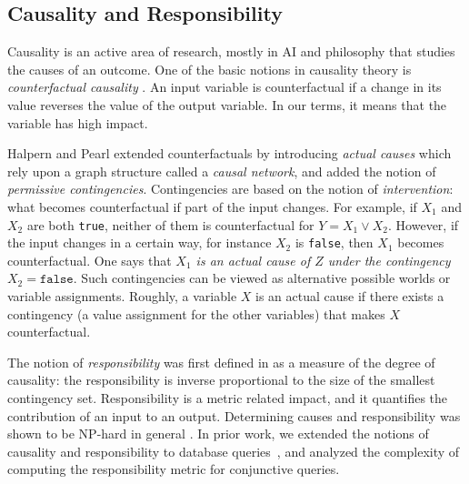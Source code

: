 \subsection*{Causality and Responsibility}
Causality is an active area of research, mostly in AI and philosophy that
studies the causes of an outcome. One of the basic notions in causality theory
is \emph{counterfactual causality} \cite{Menzies:Causation2008,Lewis1973}. An
input variable is counterfactual if a change in its value reverses the value
of the output variable. In our terms, it means that the variable has high
impact. 

Halpern and Pearl \cite{HalpernPearl:Cause2005} extended counterfactuals by
introducing \emph{actual causes} which rely upon a graph structure called a
\emph{causal network}, and added the notion of \emph{permissive
contingencies}. 
Contingencies are based on the notion of \emph{intervention}: what becomes
counterfactual if part of the input changes. For example, if $X_1$ and $X_2$
are both \texttt{true}, neither of them is counterfactual for $Y=X_1 \vee
X_2$. However, if the input changes in a certain way, for instance $X_2$ is
\texttt{false}, then $X_1$ becomes counterfactual. One says that \emph{$X_1$
is an actual cause of $Z$ under the contingency $X_2=\texttt{false}$}. Such
contingencies can be viewed as alternative possible worlds or variable
assignments. Roughly, a variable $X$ is an actual cause if there exists a
contingency (a value assignment for the other variables) that makes $X$
counterfactual.

The notion of \emph{responsibility} was first defined in
\cite{DBLP:journals/jair/ChocklerH04} as a measure of the degree of causality:
the responsibility is inverse proportional to the size of the smallest
contingency set. Responsibility is a metric related impact, and it quantifies
the contribution of an input to an output. Determining causes and
responsibility was shown to be NP-hard in general
\cite{DBLP:journals/ai/EiterL02}. In prior work, we extended the notions of causality and responsibility to
database queries~\cite{DBLP:journals/pvldb/MeliouGMS11}, and analyzed the complexity of computing the responsibility metric for conjunctive queries.

